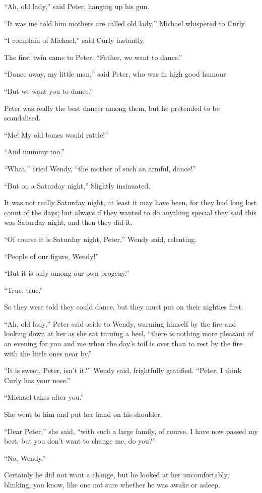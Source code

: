 ``Ah, old lady,'' said Peter, hanging up his gun.

``It was me told him mothers are called old lady,'' Michael whispered to
Curly.

``I complain of Michael,'' said Curly instantly.

The first twin came to Peter. ``Father, we want to dance.''

``Dance away, my little man,'' said Peter, who was in high good humour.

``But we want you to dance.''

Peter was really the best dancer among them, but he pretended to be
scandalised.

``Me! My old bones would rattle!''

``And mummy too.''

``What,'' cried Wendy, ``the mother of such an armful, dance!''

``But on a Saturday night,'' Slightly insinuated.

It was not really Saturday night, at least it may have been, for they
had long lost count of the days; but always if they wanted to do
anything special they said this was Saturday night, and then they did
it.

``Of course it is Saturday night, Peter,'' Wendy said, relenting.

``People of our figure, Wendy!''

``But it is only among our own progeny.''

``True, true.''

So they were told they could dance, but they must put on their nighties
first.

``Ah, old lady,'' Peter said aside to Wendy, warming himself by the fire
and looking down at her as she sat turning a heel, ``there is nothing
more pleasant of an evening for you and me when the day's toil is over
than to rest by the fire with the little ones near by.''

``It is sweet, Peter, isn't it?'' Wendy said, frightfully gratified.
``Peter, I think Curly has your nose.''

``Michael takes after you.''

She went to him and put her hand on his shoulder.

``Dear Peter,'' she said, ``with such a large family, of course, I have
now passed my best, but you don't want to change me, do you?''

``No, Wendy.''

Certainly he did not want a change, but he looked at her uncomfortably,
blinking, you know, like one not sure whether he was awake or asleep.

